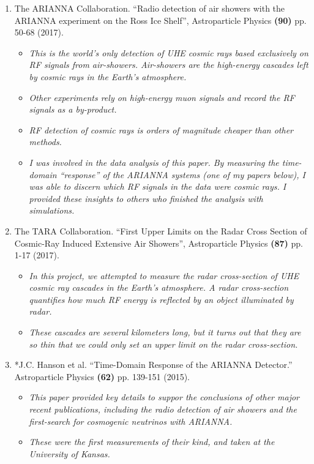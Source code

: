 \documentclass[../../main.tex]{subfiles}
\begin{document}
\begin{enumerate}
\item The ARIANNA Collaboration. ``Radio detection of air showers with the ARIANNA experiment on the Ross Ice Shelf'', Astroparticle Physics \textbf{(90)} pp. 50-68 (2017).
\begin{itemize}
\item \textit{This is the world's only detection of UHE cosmic rays based exclusively on RF signals from air-showers.  Air-showers are the high-energy cascades left by cosmic rays in the Earth's atmosphere.}
\item \textit{Other experiments rely on high-energy muon signals and record the RF signals as a by-product.}
\item \textit{RF detection of cosmic rays is orders of magnitude cheaper than other methods.}
\item \textit{I was involved in the data analysis of this paper.  By measuring the time-domain ``response'' of the ARIANNA systems (one of my papers below), I was able to discern which RF signals in the data were cosmic rays.  I provided these insights to others who finished the analysis with simulations.}
\end{itemize}
\item The TARA Collaboration. ``First Upper Limits on the Radar Cross Section of Cosmic-Ray Induced Extensive Air Showers'', Astroparticle Physics \textbf{(87)} pp. 1-17 (2017).
\begin{itemize}
\item \textit{In this project, we attempted to measure the radar cross-section of UHE cosmic ray cascades in the Earth's atmosphere. A radar cross-section quantifies how much RF energy is reflected by an object illuminated by radar.}
\item \textit{These cascades are several kilometers long, but it turns out that they are so thin that we could only set an upper limit on the radar cross-section.}
\end{itemize}
\item *J.C. Hanson et al. ``Time-Domain Response of the ARIANNA Detector.'' Astroparticle Physics \textbf{(62)} pp. 139-151 (2015).
\begin{itemize}
\item \textit{This paper provided key details to suppor the conclusions of other major recent publications, including the radio detection of air showers and the first-search for cosmogenic neutrinos with ARIANNA.}
\item \textit{These were the first measurements of their kind, and taken at the University of Kansas.}

\end{itemize}
\end{enumerate}
\end{document}
